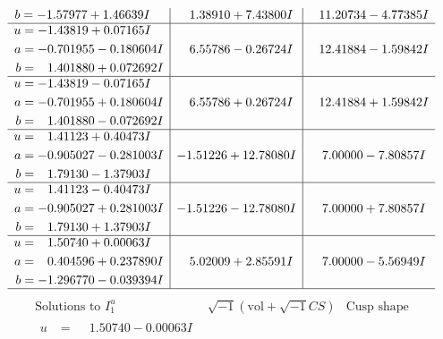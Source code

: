 \documentclass[1p]{elsarticle_modified}
\theoremstyle{definition}
\newcommand{\I}{\sqrt{-1}}
\begin{document}
$$\begin{array}{c|c|c}
\begin{aligned}
b &= -1.57977 + 1.46639 I\end{aligned}
 & \phantom{-}1.38910 + 7.43800 I & \phantom{-}11.20734 - 4.77385 I \\ \hline\begin{aligned}
u &= -1.43819 + 0.07165 I \\
a &= -0.701955 - 0.180604 I \\
b &= \phantom{-}1.401880 + 0.072692 I\end{aligned}
 & \phantom{-}6.55786 - 0.26724 I & \phantom{-}12.41884 - 1.59842 I \\ \hline\begin{aligned}
u &= -1.43819 - 0.07165 I \\
a &= -0.701955 + 0.180604 I \\
b &= \phantom{-}1.401880 - 0.072692 I\end{aligned}
 & \phantom{-}6.55786 + 0.26724 I & \phantom{-}12.41884 + 1.59842 I \\ \hline\begin{aligned}
u &= \phantom{-}1.41123 + 0.40473 I \\
a &= -0.905027 - 0.281003 I \\
b &= \phantom{-}1.79130 - 1.37903 I\end{aligned}
 & -1.51226 + 12.78080 I & \phantom{-}7.00000 - 7.80857 I \\ \hline\begin{aligned}
u &= \phantom{-}1.41123 - 0.40473 I \\
a &= -0.905027 + 0.281003 I \\
b &= \phantom{-}1.79130 + 1.37903 I\end{aligned}
 & -1.51226 - 12.78080 I & \phantom{-}7.00000 + 7.80857 I \\ \hline\begin{aligned}
u &= \phantom{-}1.50740 + 0.00063 I \\
a &= \phantom{-}0.404596 + 0.237890 I \\
b &= -1.296770 - 0.039394 I\end{aligned}
 & \phantom{-}5.02009 + 2.85591 I & \phantom{-}7.00000 - 5.56949 I\\
 \hline 
 \end{array}$$\newpage$$\begin{array}{c|c|c}  
\text{Solutions to }I^u_{1}& \I (\text{vol} + \sqrt{-1}CS) & \text{Cusp shape}\\
 \hline 
\begin{aligned}
u &= \phantom{-}1.50740 - 0.00063 I \\

\end{aligned}
\end{array}$$
\end{document}
